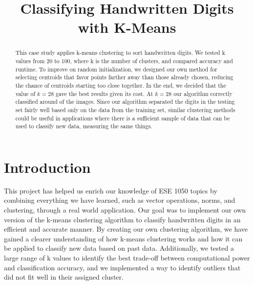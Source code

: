 \documentclass[conference]{IEEEtran}
\begin{document}
\title{Classifying Handwritten Digits with K-Means}

\author{
\and
{}
\and
{}
}

\maketitle

\begin{abstract}
This case study applies k-means clustering to sort handwritten digits. We tested k values from 20 to 100, where k is the number of clusters, and compared accuracy and runtime. To improve on random initialization, we designed our own method for selecting centroids that favor points farther away than those already chosen, reducing the chance of centroids starting too close together. In the end, we decided that the value of $k=28$ gave the best results given its cost. At $k=28$ our algorithm correctly classified around  of the images. Since our algorithm separated the digits in the testing set fairly well based only on the data from the training set, similar clustering methods could be useful in applications where there is a sufficient sample of data that can be used to classify new data, measuring the same things.
\end{abstract}

\section{Introduction}
This project has helped us enrich our knowledge of ESE 1050 topics by combining everything we have learned, such as vector operations, norms, and clustering, through a real world application. Our goal was to implement our own version of the k-means clustering algorithm to classify handwritten digits in an efficient and accurate manner. By creating our own clustering algorithm, we have gained a clearer understanding of how k-means clustering works and how it can be applied to classify new data based on past data. Additionally, we tested a large range of k values to identify the best trade-off between computational power and classification accuracy, and we implemented a way to identify outliers that did not fit well in their assigned cluster. 
\end{document}
